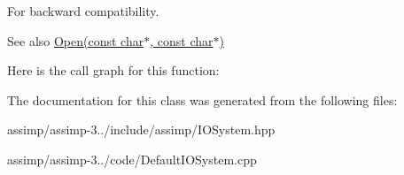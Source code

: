For backward compatibility. 

\begin{DoxySeeAlso}{See also}
\hyperlink{class_assimp_1_1_i_o_system_ac512ece3b0701de5682553007a4c0816}{Open(const char$\ast$, const char$\ast$)} 
\end{DoxySeeAlso}


Here is the call graph for this function\+:




The documentation for this class was generated from the following files\+:\begin{DoxyCompactItemize}
\item 
assimp/assimp-\/3../include/assimp/I\+O\+System.\+hpp\item 
assimp/assimp-\/3../code/Default\+I\+O\+System.\+cpp\end{DoxyCompactItemize}
